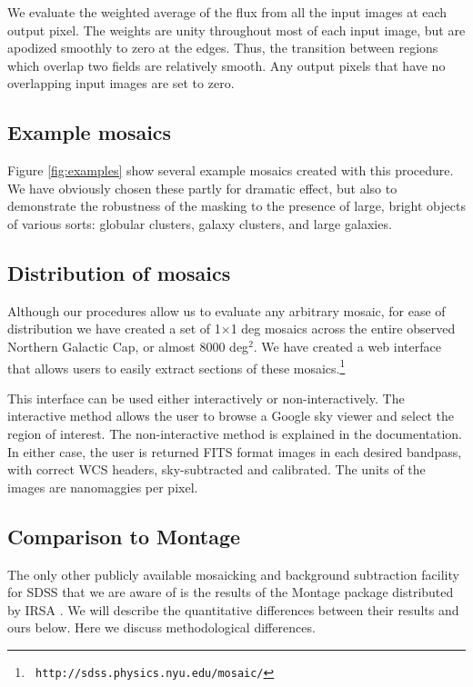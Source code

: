 \documentclass[10pt,preprint]{aastex}
\begin{document}
We evaluate the weighted average of the flux from all the input images
at each output pixel. The weights are unity throughout most of each
input image, but are apodized smoothly to zero at the edges. Thus, the
transition between regions which overlap two fields are relatively
smooth. Any output pixels that have no overlapping input images are
set to zero.

\subsection{Example mosaics}

Figure \ref{fig:examples} show several example mosaics created with
this procedure.  We have obviously chosen these partly for dramatic
effect, but also to demonstrate the robustness of the masking to the
presence of large, bright objects of various sorts: globular clusters,
galaxy clusters, and large galaxies.

\subsection{Distribution of mosaics}

Although our procedures allow us to evaluate any arbitrary mosaic, for
ease of distribution we have created a set of 1$\times$1 deg mosaics
across the entire observed Northern Galactic Cap, or almost 8000
deg$^2$. We have created a web interface that allows users to easily
extract sections of these mosaics.\footnote{\tt
http://sdss.physics.nyu.edu/mosaic/}

This interface can be used either interactively or
non-interactively. The interactive method allows the user to browse a
Google sky viewer and select the region of interest.  The
non-interactive method is explained in the documentation.  In either
case, the user is returned FITS format images in each desired
bandpass, with correct WCS headers, sky-subtracted and calibrated. The
units of the images are nanomaggies per pixel.

\subsection{Comparison to Montage}

The only other publicly available mosaicking and background
subtraction facility for SDSS that we are aware of is the results of
the Montage package distributed by IRSA
\citep{berriman03a,berriman04a}. We will describe the quantitative
differences between their results and ours below.  Here we discuss
methodological differences.
\end{document}
